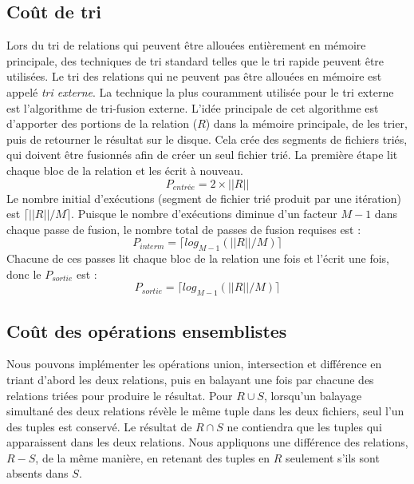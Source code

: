 \subsection{Coût de tri}
Lors du tri de relations qui peuvent être allouées entièrement en mémoire principale, des techniques de tri standard telles que le tri rapide peuvent être utilisées. Le tri des relations qui ne peuvent pas être allouées en mémoire est appelé \textit{tri externe}. La technique la plus couramment utilisée pour le tri externe est l'algorithme de tri-fusion externe. L'idée principale de cet algorithme est d'apporter des portions de la relation ($R$) dans la mémoire principale, de les trier, puis de retourner le résultat sur le disque. Cela crée des segments de fichiers triés, qui doivent être fusionnés afin de créer un seul fichier trié.
La première étape lit chaque bloc de la relation et les écrit à nouveau.
\begin{equation}
P_{entrée} = 2 \times || R ||
\end{equation}
Le nombre initial d'exécutions (segment de fichier trié produit par une itération) est $\lceil|| R ||/M\rceil$. Puisque le nombre d'exécutions diminue d'un facteur $M-1$ dans chaque passe de fusion, le nombre total de passes de fusion requises est :
\begin{equation}
P_{interm} = \lceil log_{M - 1} ( || R || / M )\rceil
\end{equation}
Chacune de ces passes lit chaque bloc de la relation une fois et l'écrit une fois, donc le $P_{sortie}$ est :
\begin{equation}
P_{sortie} = \lceil log_{M - 1} ( || R || / M )\rceil
\end{equation}

\subsection{Coût des opérations ensemblistes}
Nous pouvons implémenter les opérations union, intersection et différence en triant d'abord les deux relations, puis en balayant une fois par chacune des relations triées pour produire le résultat. Pour $R \cup S$, lorsqu'un balayage simultané des deux relations révèle le même tuple dans les deux fichiers, seul l'un des tuples est conservé. Le résultat de $R \cap S$ ne contiendra que les tuples qui apparaissent dans les deux relations. Nous appliquons une différence des relations, $R - S$, de la même manière, en retenant des tuples en $R$ seulement s'ils sont absents dans $S$.

